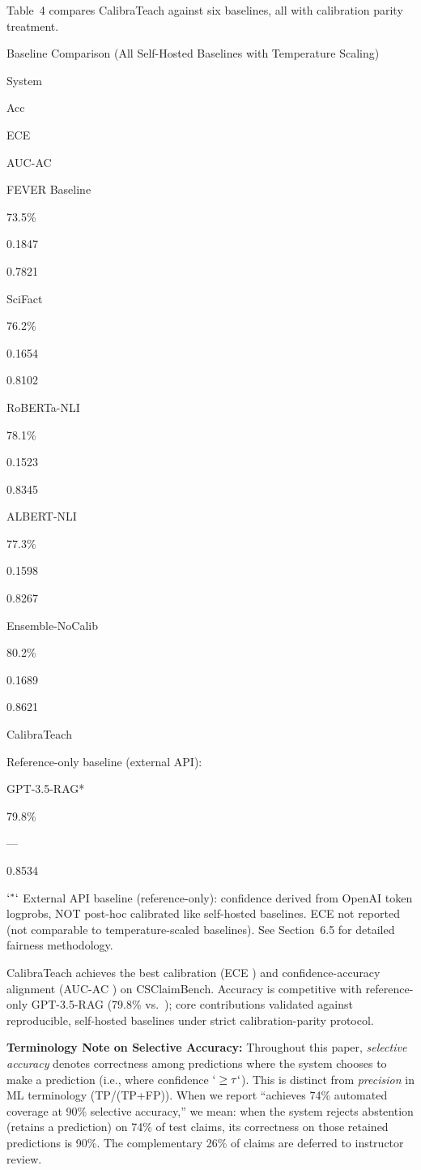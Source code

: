 Table~4 compares CalibraTeach against six baselines, all with calibration parity treatment.

\protect{}\label{tab:baselines}
Baseline Comparison (All Self-Hosted Baselines with Temperature Scaling)

System

Acc

ECE

AUC-AC

FEVER Baseline

73.5\%

0.1847

0.7821

SciFact

76.2\%

0.1654

0.8102

RoBERTa-NLI

78.1\%

0.1523

0.8345

ALBERT-NLI

77.3\%

0.1598

0.8267

Ensemble-NoCalib

80.2\%

0.1689

0.8621

CalibraTeach

Reference-only baseline (external API):

GPT-3.5-RAG*

79.8\%

---

0.8534

\(`^{*}`\) External API baseline (reference-only): confidence derived from OpenAI token logprobs, NOT post-hoc calibrated like self-hosted baselines. ECE not reported (not comparable to temperature-scaled baselines). See Section~6.5 for detailed fairness methodology.

CalibraTeach achieves the best calibration (ECE ) and confidence-accuracy alignment (AUC-AC ) on CSClaimBench. Accuracy is competitive with reference-only GPT-3.5-RAG (79.8\% vs.~); core contributions validated against reproducible, self-hosted baselines under strict calibration-parity protocol.

\textbf{Terminology Note on Selective Accuracy:} Throughout this paper, \emph{selective accuracy} denotes correctness among predictions where the system chooses to make a prediction (i.e., where confidence \(`\geq \tau`\)). This is distinct from \emph{precision} in ML terminology (TP/(TP+FP)). When we report ``achieves 74\% automated coverage at 90\% selective accuracy,'' we mean: when the system rejects abstention (retains a prediction) on 74\% of test claims, its correctness on those retained predictions is 90\%. The complementary 26\% of claims are deferred to instructor review.

